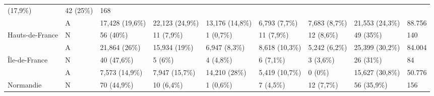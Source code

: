 \begin{table}[H]
{\begin{tabular}{|l|l|l|l|l|l|l|l|l|}
            (17,9\%)                                          & 42 (25\%)       & 168                                                                                                          \\
            ~                                                 & A               & 17,428 (19,6\%)                   & 22,123 (24,9\%) & 13,176 (14,8\%)  & 6,793
            (7,7\%)                                           & 7,683 (8,7\%)   & 21,553 (24,3\%)                   & 88.756                                                                   \\ \hline
            Hauts-de-France                                   & N               & 56 (40\%)                         & 11 (7,9\%)      & 1 (0,7\%)        & 11 (7,9\%)     &
            12 (8,6\%)                                        & 49 (35\%)       & 140                                                                                                          \\
            ~                                                 & A               & 21,864 (26\%)                     & 15,934 (19\%)   & 6,947 (8,3\%)    & 8,618 (10,3\%) &
            5,242 (6,2\%)                                     & 25,399 (30,2\%) & 84.004                                                                                                       \\ \hline
            Île-de-France                                     & N               & 40 (47,6\%)                       & 5 (6\%)         & 4 (4,8\%)        & 6 (7,1\%)      & 3
            (3,6\%)                                           & 26 (31\%)       & 84                                                                                                           \\
            ~                                                 & A               & 7,573 (14,9\%)                    & 7,947 (15,7\%)  & 14,210 (28\%)    & 5,419 (10,7\%)
                                                              & 0 (0\%)         & 15,627 (30,8\%)                   & 50.776                                                                   \\ \hline
            Normandie                                         & N               & 70 (44,9\%)                       & 10 (6,4\%)      & 1 (0,6\%)        & 7 (4,5\%)      & 12
            (7,7\%)                                           & 56 (35,9\%)     & 156                                                                                                          \\

\end{tabular}}
\end{table}
